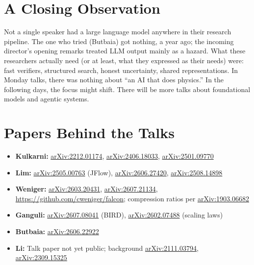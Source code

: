 \documentclass[11pt]{article}
\begin{document}
\section*{A Closing Observation}

Not a single speaker had a large language model anywhere in their research pipeline. The one who tried (Butbaia) got nothing, a year ago; the incoming director's opening remarks treated LLM output mainly as a hazard. What these researchers actually need (or at least, what they expressed as their needs) were: fast verifiers, structured search, honest uncertainty, shared representations. In Monday talks, there was nothing about ``an AI that does physics.'' In the following days, the focus might shift. There will be more talks about foundational models and agentic systems.

\section*{Papers Behind the Talks}

\begin{itemize}[leftmargin=*]
    \item \textbf{Kulkarni:} \href{https://arxiv.org/abs/2212.01174}{arXiv:2212.01174}, \href{https://arxiv.org/abs/2406.18033}{arXiv:2406.18033}, \href{https://arxiv.org/abs/2501.09770}{arXiv:2501.09770}
    \item \textbf{Lim:} \href{https://arxiv.org/abs/2505.00763}{arXiv:2505.00763} (JFlow), \href{https://arxiv.org/abs/2606.27420}{arXiv:2606.27420}, \href{https://arxiv.org/abs/2508.14898}{arXiv:2508.14898}
    \item \textbf{Weniger:} \href{https://arxiv.org/abs/2603.20431}{arXiv:2603.20431}, \href{https://arxiv.org/abs/2607.21134}{arXiv:2607.21134}, \url{https://github.com/cweniger/falcon}; compression ratios per \href{https://arxiv.org/abs/1903.06682}{arXiv:1903.06682}
    \item \textbf{Ganguli:} \href{https://arxiv.org/abs/2607.08041}{arXiv:2607.08041} (BIRD), \href{https://arxiv.org/abs/2602.07488}{arXiv:2602.07488} (scaling laws)
    \item \textbf{Butbaia:} \href{https://arxiv.org/abs/2606.22922}{arXiv:2606.22922}
    \item \textbf{Li:} Talk paper not yet public; background \href{https://arxiv.org/abs/2111.03794}{arXiv:2111.03794}, \href{https://arxiv.org/abs/2309.15325}{arXiv:2309.15325}
\end{itemize}
\end{document}
